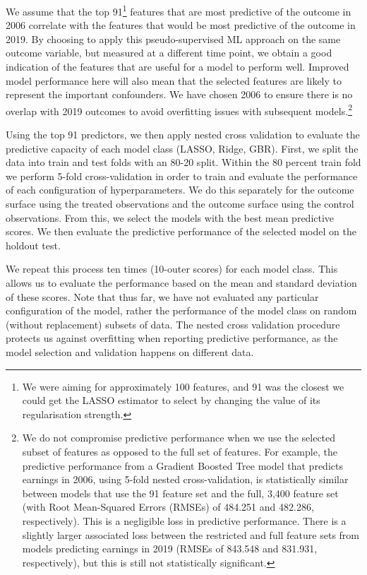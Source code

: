 \documentclass[12pt, a4paper]{article}
\begin{document}
We assume that the top 91\footnote{We were aiming for approximately 100
features, and 91 was the closest we could get the LASSO estimator to select by
changing the value of its regularisation strength.} features that are most
predictive of the outcome in 2006 correlate with the features that would be
most predictive of the outcome in 2019. By choosing to apply this
pseudo-supervised ML approach on the same outcome variable, but measured at a
different time point, we obtain a good indication of the features that are
useful for a model to perform well. Improved model performance here will also
mean that the selected features are likely to represent the important
confounders. We have chosen 2006 to ensure there is no overlap with 2019
outcomes to avoid overfitting issues with subsequent models.\footnote{We do not
compromise predictive performance when we use the selected subset of features
as opposed to the full set of features. For example, the predictive performance
from a Gradient Boosted Tree model that predicts earnings in 2006, using 5-fold
nested cross-validation, is statistically similar between models that use the
91 feature set and the full, 3,400 feature set (with Root Mean-Squared Errors
(RMSEs) of 484.251 and 482.286, respectively). This is a negligible loss in
predictive performance. There is a slightly larger associated loss between the
restricted and full feature sets from models predicting earnings in 2019 (RMSEs
of 843.548 and 831.931, respectively), but this is still not statistically
significant.}

Using the top 91 predictors, we then apply nested cross validation to evaluate
the predictive capacity of each model class (LASSO, Ridge, GBR). First, we
split the data into train and test folds with an 80-20 split. Within the 80
percent train fold we perform 5-fold cross-validation in order to train and
evaluate the performance of each configuration of hyperparameters. We do this
separately for the outcome surface using the treated observations and the
outcome surface using the control observations. From this, we select the models
with the best mean predictive scores. We then evaluate the predictive
performance of the selected model on the holdout test.

We repeat this process ten times (10-outer scores) for each model class. This
allows us to evaluate the performance based on the mean and standard deviation
of these scores. Note that thus far, we have not evaluated any particular
configuration of the model, rather the performance of the model class on random
(without replacement) subsets of data. The nested cross validation procedure
protects us against overfitting when reporting predictive performance, as the
model selection and validation happens on different data.
\end{document}
